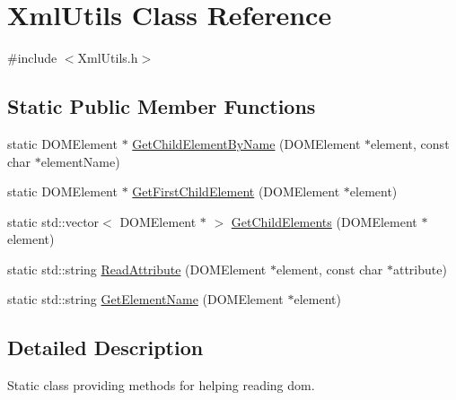 \hypertarget{class_xml_utils}{\section{Xml\+Utils Class Reference}
\label{class_xml_utils}
}


{\ttfamily \#include $<$Xml\+Utils.\+h$>$}

\subsection*{Static Public Member Functions}
\begin{DoxyCompactItemize}
\item 
static D\+O\+M\+Element $\ast$ \hyperlink{class_xml_utils_a657d5ac4fb8383745b85e7bf81b4cb0a}{Get\+Child\+Element\+By\+Name} (D\+O\+M\+Element $\ast$element, const char $\ast$element\+Name)
\item 
static D\+O\+M\+Element $\ast$ \hyperlink{class_xml_utils_a5c7a6b135f074beade050a508b6f64be}{Get\+First\+Child\+Element} (D\+O\+M\+Element $\ast$element)
\item 
static std\+::vector$<$ D\+O\+M\+Element $\ast$ $>$ \hyperlink{class_xml_utils_a7177dd1569d717224308a40ef025902d}{Get\+Child\+Elements} (D\+O\+M\+Element $\ast$element)
\item 
static std\+::string \hyperlink{class_xml_utils_a8c3f74361f1ab2d877eb4c078a07359e}{Read\+Attribute} (D\+O\+M\+Element $\ast$element, const char $\ast$attribute)
\item 
static std\+::string \hyperlink{class_xml_utils_a915f9bd1d5d359914acf37fb5f0f40a7}{Get\+Element\+Name} (D\+O\+M\+Element $\ast$element)
\end{DoxyCompactItemize}


\subsection{Detailed Description}
Static class providing methods for helping reading dom. 

